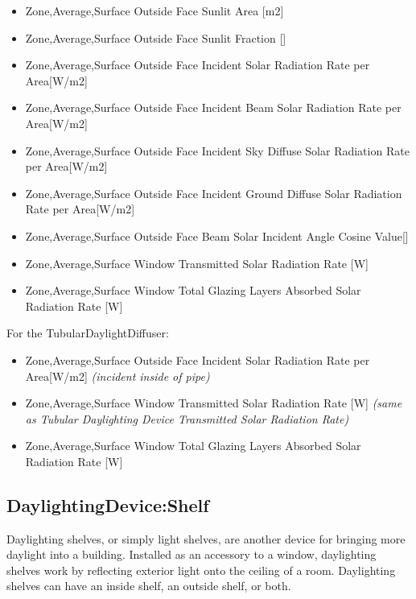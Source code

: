 \begin{itemize}
\item
  Zone,Average,Surface Outside Face Sunlit Area {[}m2{]}
\item
  Zone,Average,Surface Outside Face Sunlit Fraction {[]}
\item
  Zone,Average,Surface Outside Face Incident Solar Radiation Rate per Area{[}W/m2{]}
\item
  Zone,Average,Surface Outside Face Incident Beam Solar Radiation Rate per Area{[}W/m2{]}
\item
  Zone,Average,Surface Outside Face Incident Sky Diffuse Solar Radiation Rate per Area{[}W/m2{]}
\item
  Zone,Average,Surface Outside Face Incident Ground Diffuse Solar Radiation Rate per Area{[}W/m2{]}
\item
  Zone,Average,Surface Outside Face Beam Solar Incident Angle Cosine Value{[]}
\item
  Zone,Average,Surface Window Transmitted Solar Radiation Rate {[}W{]}
\item
  Zone,Average,Surface Window Total Glazing Layers Absorbed Solar Radiation Rate {[}W{]}
\end{itemize}

For the TubularDaylightDiffuser:

\begin{itemize}
\item
  Zone,Average,Surface Outside Face Incident Solar Radiation Rate per Area{[}W/m2{]} \emph{(incident inside of pipe)}
\item
  Zone,Average,Surface Window Transmitted Solar Radiation Rate {[}W{]} \emph{(same as Tubular Daylighting Device Transmitted Solar Radiation Rate)}
\item
  Zone,Average,Surface Window Total Glazing Layers Absorbed Solar Radiation Rate {[}W{]}
\end{itemize}

\subsection{DaylightingDevice:Shelf}\label{daylightingdeviceshelf}

Daylighting shelves, or simply light shelves, are another device for bringing more daylight into a building. Installed as an accessory to a window, daylighting shelves work by reflecting exterior light onto the ceiling of a room. Daylighting shelves can have an inside shelf, an outside shelf, or both.


